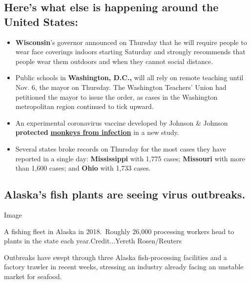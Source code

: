 \hypertarget{heres-what-else-is-happening-around-the-united-states}{%
\subsection{Here's what else is happening around the United
States:}\label{heres-what-else-is-happening-around-the-united-states}}

\begin{itemize}
\item
  \textbf{Wisconsin}'s governor announced on Thursday that he will
  require people to wear face coverings indoors starting Saturday and
  strongly recommends that people wear them outdoors and when they
  cannot social distance.
\item
  Public schools in \textbf{Washington, D.C.,} will all rely on remote
  teaching until Nov. 6, the mayor on Thursday. The Washington Teachers'
  Union had petitioned the mayor to issue the order, as cases in the
  Washington metropolitan region continued to tick upward.
\end{itemize}

\begin{itemize}
\item
  An experimental coronavirus vaccine developed by Johnson \& Johnson
  \textbf{protected}
  \textbf{\href{https://www.nytimes3xbfgragh.onion/2020/07/30/health/covid-19-vaccine-monkeys.html}{monkeys
  from infection}} in a new study.
\item
  Several states broke records on Thursday for the most cases they have
  reported in a single day: \textbf{Mississippi} with 1,775 cases;
  \textbf{Missouri} with more than 1,600 cases; and \textbf{Ohio} with
  1,733 cases.
\end{itemize}

\hypertarget{alaskas-fish-plants-are-seeing-virus-outbreaks}{%
\subsection{Alaska's fish plants are seeing virus
outbreaks.}\label{alaskas-fish-plants-are-seeing-virus-outbreaks}}

Image

A fishing fleet in Alaska in 2018.~Roughly 26,000 processing workers
head to plants in the state each year.Credit...Yereth Rosen/Reuters

Outbreaks have swept through three Alaska fish-processing facilities and
a factory trawler in recent weeks, stressing an industry already facing
an unstable market for seafood.


